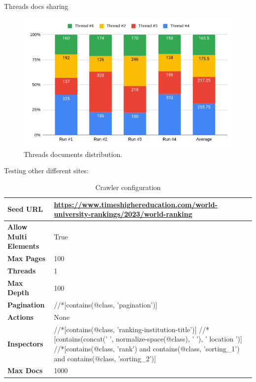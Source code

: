 {Threads docs sharing

\begin{figure}[h]	
     \centering
     \includegraphics[width=13cm]{images/threads_share.png}
     \caption{Threads documents distribution.}
     \label{fig:google-arch}
\end{figure}

Testing other different sites: 

\begin{table}[ht] 
{\footnotesize
\begin{tabular}{ P{3cm} ||P{10.1cm}  }      %
 \hline \hline
\textbf{Seed URL} & \href{https://www.timeshighereducation.com/world-university-rankings/2023/world-ranking}{https://www.timeshighereducation.com/world-university-rankings/2023/world-ranking}\T\B 
\\ 
\hline
\textbf{Allow Multi Elements} & True \T\B 
\\ 
\hline
\textbf{Max Pages} & 100\T\B 
\\ 
\hline
\textbf{Threads} & 1\T\B 
\\ 
\hline
\textbf{Max Depth} & 100\T\B 
\\ 
\hline
\textbf{Pagination} & //*[contains(@class, 'pagination')]\T\B 
\\ 
\hline
\textbf{Actions} & None\T\B 
\\ 
\hline
\textbf{Inspectors} & //*[contains(@class, 'ranking-institution-title')] \newline //*[contains(concat(' ', normalize-space(@class), ' '), ' location ')] \newline //*[contains(@class, 'rank') and contains(@class, 'sorting\_1') and contains(@class, 'sorting\_2')]
\T\B 
\\ 
\hline
\textbf{Max Docs} & 1000\T\B 
\\ 
\hline \hline
    \end{tabular}
}
  \captionsetup{justification=centering,margin=2cm}
  \caption{Crawler configuration}
\end{table}



}
